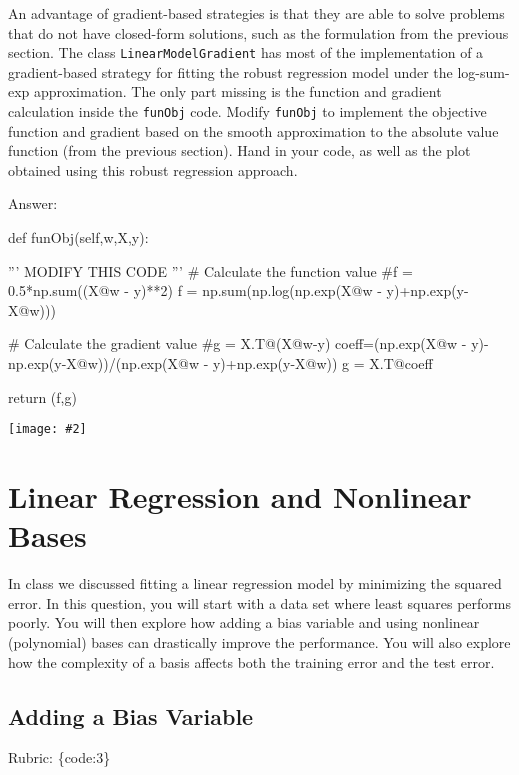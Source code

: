 \documentclass{article}
\def\rubric#1{\gre{Rubric: \{#1\}}}{}
\def\ans#1{\par\gre{Answer: #1}}
\def\blu#1{{\color{blu}#1}}
\def\gre#1{{\color{gre}#1}}
\newcommand{\centerfig}[2]{\begin{center}\texttt{[image: \#2]}\end{center}}
\begin{document}
An advantage of gradient-based strategies is that they are able to solve
problems that do not have closed-form solutions, such as the formulation from the
previous section. The class \texttt{LinearModelGradient} has most of the implementation
of a gradient-based strategy for fitting the robust regression model under the log-sum-exp approximation.
The only part missing is the function and gradient calculation inside the \texttt{funObj} code.
\blu{Modify \texttt{funObj} to implement the objective function and gradient based on the smooth
approximation to the absolute value function (from the previous section). Hand in your code, as well
as the plot obtained using this robust regression approach.}
\ans{}
\begin{python}
def funObj(self,w,X,y):

''' MODIFY THIS CODE '''
# Calculate the function value
#f = 0.5*np.sum((X@w - y)**2)
f = np.sum(np.log(np.exp(X@w - y)+np.exp(y-X@w)))

# Calculate the gradient value
#g = X.T@(X@w-y)
coeff=(np.exp(X@w - y)-np.exp(y-X@w))/(np.exp(X@w - y)+np.exp(y-X@w))
g = X.T@coeff

return (f,g)
\end{python}
\centerfig{1}{../figs/least_squares_robust.pdf}
\section{Linear Regression and Nonlinear Bases}

In class we discussed fitting a linear regression model by minimizing the squared error.
In this question, you will start with a data set where least squares performs poorly.
You will then explore how adding a bias variable and using nonlinear (polynomial) bases can drastically improve the performance.
You will also explore how the complexity of a basis affects both the training error and the test error.

\subsection{Adding a Bias Variable}
\label{biasvar}
\rubric{code:3}
\end{document}
